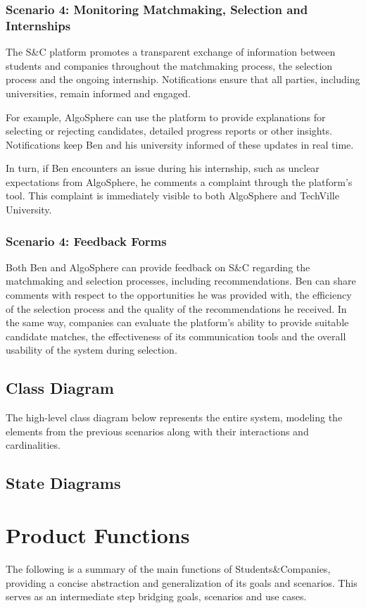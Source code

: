 \subsubsection{Scenario 4: Monitoring Matchmaking, Selection and Internships}
The S\&C platform promotes a transparent exchange of information between students and companies throughout the matchmaking process, the selection process and the ongoing internship.
Notifications ensure that all parties, including universities, remain informed and engaged.

For example, AlgoSphere can use the platform to provide explanations for selecting or rejecting candidates, detailed progress reports or other insights.
Notifications keep Ben and his university informed of these updates in real time.

In turn, if Ben encounters an issue during his internship, such as unclear expectations from AlgoSphere, he comments a complaint through the platform's tool.
This complaint is immediately visible to both AlgoSphere and TechVille University.

\subsubsection{Scenario 4: Feedback Forms}
Both Ben and AlgoSphere can provide feedback on S\&C regarding the matchmaking and selection processes, including recommendations.
Ben can share comments with respect to the opportunities he was provided with, the efficiency of the selection process and the quality of the recommendations he received.
In the same way, companies can evaluate the platform's ability to provide suitable candidate matches, the effectiveness of its communication tools and the overall usability of the system during selection.

\subsection{Class Diagram}
The high-level class diagram below represents the entire system, modeling the elements from the previous scenarios along with their interactions and cardinalities.

\subsection{State Diagrams}
\section{Product Functions}
The following is a summary of the main functions of Students\&Companies, providing a concise abstraction and generalization of its goals and scenarios.
This serves as an intermediate step bridging goals, scenarios and use cases.

